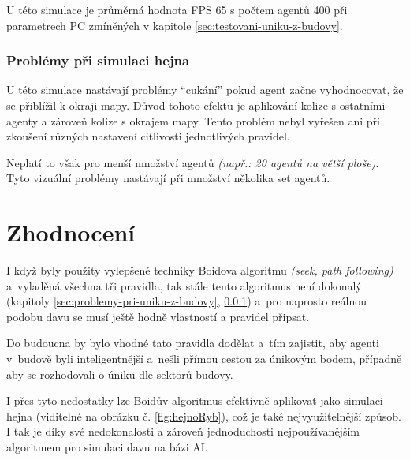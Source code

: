 \documentclass[czech,public,dept460,male,cpdeclaration]{diploma}
\begin{document}

U této simulace je průměrná hodnota FPS 65 s počtem agentů 400 při parametrech PC zmíněných v kapitole \ref{sec:testovani-uniku-z-budovy}.

\subsubsection{Problémy při simulaci hejna}\label{sec:problemy-pri-simulace-hejna}
U této simulace nastávají problémy ``cukání'' pokud agent začne vyhodnocovat, že se přiblížil k okraji mapy. Důvod tohoto efektu je aplikování kolize s ostatními agenty a zároveň kolize s okrajem mapy. Tento problém nebyl vyřešen ani při zkoušení různých nastavení citlivosti jednotlivých pravidel.

Neplatí to však pro menší množství agentů \textit{(např.: 20 agentů na větší ploše)}. Tyto vizuální problémy nastávají při množství několika set agentů.

\newpage
\section{Zhodnocení}


I když byly použity vylepšené techniky Boidova algoritmu \textit{(seek, path following)} a~vyladěná všechna tři pravidla, tak stále tento algoritmus není dokonalý (kapitoly \ref{sec:problemy-pri-uniku-z-budovy}, \ref{sec:problemy-pri-simulace-hejna}) a~pro naprosto reálnou podobu davu se musí ještě hodně vlastností a pravidel připsat.

Do budoucna by bylo vhodné tato pravidla dodělat a~tím zajistit, aby agenti v~budově byli inteligentnější a~nešli přímou cestou za únikovým bodem, případně aby se rozhodovali o úniku dle sektorů budovy.

I přes tyto nedostatky lze Boidův algoritmus efektivně aplikovat jako simulaci hejna (viditelné na obrázku č. \ref{fig:hejnoRyb}), což je také nejvyužitelnější způsob. I tak je díky své nedokonalosti a zároveň jednoduchosti nejpoužívanějším algoritmem pro simulaci davu na bázi AI.
\end{document}
